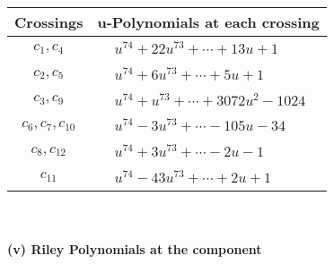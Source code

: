 \documentclass[1p]{elsarticle_modified}
\theoremstyle{definition}
\begin{document}
\begin{tabular}{m{50pt}|m{274pt}}
Crossings & \hspace{64pt}u-Polynomials at each crossing \\
\hline $$\begin{aligned}c_{1},c_{4}\end{aligned}$$&$\begin{aligned}
&u^{74}+22 u^{73}+\cdots+13 u+1
\end{aligned}$\\
\hline $$\begin{aligned}c_{2},c_{5}\end{aligned}$$&$\begin{aligned}
&u^{74}+6 u^{73}+\cdots+5 u+1
\end{aligned}$\\
\hline $$\begin{aligned}c_{3},c_{9}\end{aligned}$$&$\begin{aligned}
&u^{74}+u^{73}+\cdots+3072 u^2-1024
\end{aligned}$\\
\hline $$\begin{aligned}c_{6},c_{7},c_{10}\end{aligned}$$&$\begin{aligned}
&u^{74}-3 u^{73}+\cdots-105 u-34
\end{aligned}$\\
\hline $$\begin{aligned}c_{8},c_{12}\end{aligned}$$&$\begin{aligned}
&u^{74}+3 u^{73}+\cdots-2 u-1
\end{aligned}$\\
\hline $$\begin{aligned}c_{11}\end{aligned}$$&$\begin{aligned}
&u^{74}-43 u^{73}+\cdots+2 u+1
\end{aligned}$\\
\hline
\end{tabular}\\~\\
\newpage\renewcommand{\arraystretch}{1}
\flushleft \textbf{(v) Riley Polynomials at the component}\newline \\
\end{document}
